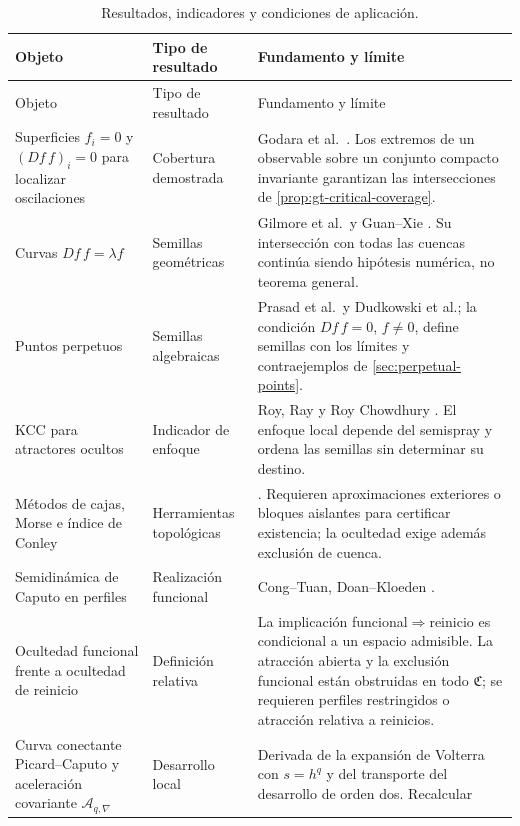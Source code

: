 \begin{longtable}{@{}L{4.0cm}L{3.0cm}L{6.2cm}@{}}
\caption{Resultados, indicadores y condiciones de aplicación.}
\label{tab:gt-novelty-map}\\
\toprule
Objeto & Tipo de resultado & Fundamento y límite\\
\midrule
\endfirsthead
\toprule
Objeto & Tipo de resultado & Fundamento y límite\\
\midrule
\endhead
Superficies $f_i=0$ y $(Df\,f)_i=0$ para localizar oscilaciones & Cobertura demostrada
& Godara et al.\ \cite{GodaraEtAl2018CriticalSurfaces}. Los extremos de un
observable sobre un conjunto compacto invariante garantizan las intersecciones
de \cref{prop:gt-critical-coverage}.\\
Curvas $Df\,f=\lambda f$ & Semillas geométricas & Gilmore et al.\ y Guan--Xie
\cite{GilmoreEtAl2010Connecting,GuanXie2021Connecting}. Su intersección con
todas las cuencas continúa siendo hipótesis numérica, no teorema general.\\
Puntos perpetuos & Semillas algebraicas & Prasad et al.\ y Dudkowski et al.;
la condición \(Df\,f=0\), \(f\ne0\), define semillas con los límites y
contraejemplos de \cref{sec:perpetual-points}.\\
KCC para atractores ocultos & Indicador de enfoque & Roy, Ray y Roy Chowdhury
\cite{RoyRayChowdhury2024KCC}. El enfoque local depende del semispray y ordena
las semillas sin determinar su destino.\\
Métodos de cajas, Morse e índice de Conley & Herramientas topológicas &
\cite{DellnitzHohmann1997Subdivision,KaliesEtAl2005ChainRecurrence,
MischaikowEtAl2016Conley}. Requieren aproximaciones exteriores o bloques
aislantes para certificar existencia; la ocultedad exige además exclusión de
cuenca.\\
Semidinámica de Caputo en perfiles & Realización funcional & Cong--Tuan,
Doan--Kloeden \cite{CongTuan2017Nonlocal,DoanKloeden2021Semidynamical,
DoanKloeden2024Attractors}.\\
Ocultedad funcional frente a ocultedad de reinicio & Definición relativa &
La implicación funcional$\Rightarrow$reinicio es condicional a un espacio
admisible. La atracción abierta y la exclusión funcional están obstruidas en
todo $\mathfrak C$; se requieren perfiles restringidos o atracción relativa
a reinicios.\\
Curva conectante Picard--Caputo y aceleración covariante
$\mathcal A_{q,\nabla}$ & Desarrollo local & Derivada de la expansión de
Volterra con $s=h^q$ y del transporte del desarrollo de orden dos. Recalcular

\end{longtable}
